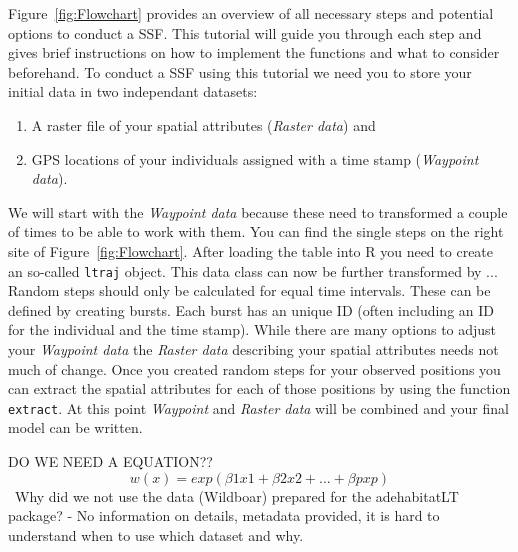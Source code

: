\documentclass[11pt, a4paper]{article} %
\begin{document}
Figure~\ref{fig:Flowchart} provides an overview of all necessary steps and potential options to conduct a SSF. This tutorial will guide you through each step and gives brief instructions on how to implement the functions and what to consider beforehand.
To conduct a SSF using this tutorial we need you to store your initial data  in two independant datasets: \begin{enumerate} \item {A raster file of your spatial attributes (\emph{Raster data})} and \item{GPS locations of your individuals assigned with a time stamp (\emph{Waypoint data})}. \end{enumerate} 
We will start with the \emph{Waypoint data} because these need to transformed a couple of times to be able to work with them. You can find the single steps on the right site of Figure~\ref{fig:Flowchart}. After loading the table into R you need to create an so-called \texttt{ltraj} object. This data class can now be further transformed by ... Random steps should only be calculated for equal time intervals. These can be defined by creating bursts. Each burst has an unique ID (often including an ID for the individual and the time stamp). While there are many options to adjust your \emph{Waypoint data} the \emph{Raster data} describing your spatial attributes needs not much of change. Once you created random steps for your observed positions you can extract the spatial attributes for each of those positions by using the function \texttt{extract}. At this point \emph{Waypoint} and \emph{Raster data} will be combined and your final model can be written.   


DO WE NEED A EQUATION??
\[
\displaystyle w(x) = exp(\beta1 x1 + \beta2x2 + ... + \beta p xp)
\]
\
Why did we not use the data (Wildboar) prepared for the adehabitatLT package? - No information on details, metadata provided, it is hard to understand when to use which dataset and why.
\end{document}
